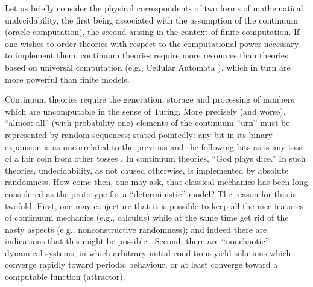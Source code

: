 Let us briefly consider the
physical correspondents of
two forms of mathematical undecidability, the first being associated
with the assumption of the
continuum (oracle computation), the second arising in the context of
finite computation.
If one wishes to order theories with respect to the computational power
necessary to implement them, continuum theories require more resources
than theories based on universal computation (e.g., Cellular Automata
\cite{fredkin,toffoli,feynman}), which in turn are more powerful than
finite models.


Continuum theories require the generation, storage and
processing of numbers which are uncomputable in the sense of Turing.
More precisely (and worse), ``almost all'' (with probability one)
elements of the continuum ``urn'' must be represented by random
sequences; stated pointedly:
any bit in its binary expansion is as uncorrelated to the previous and
the following bits as is any toss of a fair coin from other tosses
\cite{chaitin,calude}. In continuum theories, ``God plays dice.''
In such theories, undecidability, as not caused otherwise,
is implemented by
absolute randomness.
How come then, one may ask, that classical mechanics has been long
considered as the prototype for a ``deterministic'' model? The reason
for this is twofold: First, one may conjecture that it is possible to
keep
all the nice features of continuum mechanics (e.g.,
calculus) while at the same time get rid of the nasty aspects (e.g.,
nonconstructive randomness); and indeed there are indications that
this might be possible
\cite{bishop}. Second, there are ``nonchaotic'' dynamical systems, in
which arbitrary initial conditions  yield
solutions which converge rapidly toward periodic behaviour, or at
least converge toward a computable function (attractor).

